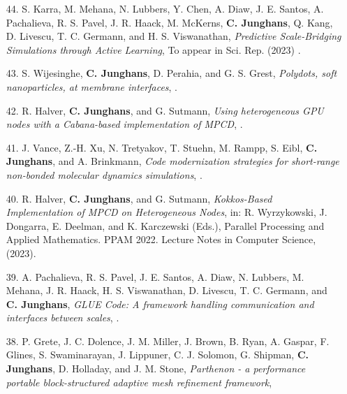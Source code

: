 \documentclass{article}
\begin{document}
\begin{enumerate}
\item[44.] S. Karra, M. Mehana, N. Lubbers, Y. Chen, A. Diaw, J. E. Santos, A. Pachalieva, R. S. Pavel, J. R. Haack, M. McKerns, \textbf{C. Junghans}, Q. Kang, D. Livescu, T. C. Germann, and H. S. Viswanathan, 
  \textit{Predictive Scale-Bridging Simulations through Active Learning},
  To appear in Sci. Rep. (2023) .
\item[43.] S. Wijesinghe, \textbf{C. Junghans}, D. Perahia, and G. S. Grest,
   \textit{Polydots, soft nanoparticles, at membrane interfaces},
    .
\item[42.] R. Halver, \textbf{C. Junghans}, and G. Sutmann,
   \textit{Using heterogeneous GPU nodes with a Cabana-based implementation of MPCD},
   .
\item[41.] J. Vance, Z.-H. Xu, N. Tretyakov, T. Stuehn, M. Rampp, S. Eibl, \textbf{C. Junghans}, and A. Brinkmann,
   \textit{Code modernization strategies for short-range non-bonded molecular dynamics simulations},
   .
\item[40.] R. Halver, \textbf{C. Junghans}, and G. Sutmann,
   \textit{Kokkos-Based Implementation of MPCD on Heterogeneous Nodes},
   in: R. Wyrzykowski, J. Dongarra, E. Deelman, and K. Karczewski (Eds.),
   Parallel Processing and Applied Mathematics. PPAM 2022. Lecture Notes in Computer Science,  (2023).
\item[39.] A. Pachalieva, R. S. Pavel, J. E. Santos, A. Diaw, N. Lubbers, M. Mehana, J. R. Haack, H. S. Viswanathan, D. Livescu, T. C. Germann, and \textbf{C. Junghans},
   \textit{GLUE Code: A framework handling communication and interfaces between scales},
   .
\item[38.] P. Grete, J. C. Dolence, J. M. Miller, J. Brown, B. Ryan, A. Gaspar, F. Glines, S. Swaminarayan, J. Lippuner, C. J. Solomon, G. Shipman, \textbf{C. Junghans}, D. Holladay, and J. M. Stone,
   \textit{Parthenon - a performance portable block-structured adaptive mesh refinement framework},

\end{enumerate}
\end{document}
